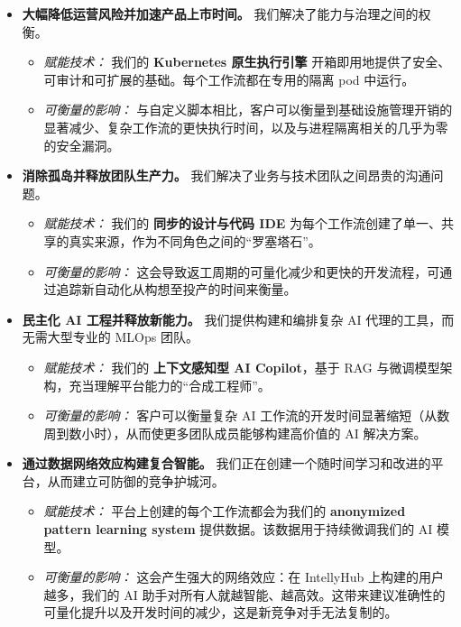 \documentclass[11pt, a4paper, oneside]{article}
\begin{document}
\begin{itemize}
    \item \textbf{大幅降低运营风险并加速产品上市时间。} 我们解决了能力与治理之间的权衡。
    \begin{itemize}
        \item \textit{赋能技术：} 我们的 \textbf{Kubernetes 原生执行引擎} 开箱即用地提供了安全、可审计和可扩展的基础。每个工作流都在专用的隔离 pod 中运行。
        \item \textit{可衡量的影响：} 与自定义脚本相比，客户可以衡量到基础设施管理开销的显著减少、复杂工作流的更快执行时间，以及与进程隔离相关的几乎为零的安全漏洞。
    \end{itemize}

    \item \textbf{消除孤岛并释放团队生产力。} 我们解决了业务与技术团队之间昂贵的沟通问题。
    \begin{itemize}
        \item \textit{赋能技术：} 我们的 \textbf{同步的设计与代码 IDE} 为每个工作流创建了单一、共享的真实来源，作为不同角色之间的“罗塞塔石”。
        \item \textit{可衡量的影响：} 这会导致返工周期的可量化减少和更快的开发流程，可通过追踪新自动化从构想至投产的时间来衡量。
    \end{itemize}

    \item \textbf{民主化 AI 工程并释放新能力。} 我们提供构建和编排复杂 AI 代理的工具，而无需大型专业的 MLOps 团队。
    \begin{itemize}
        \item \textit{赋能技术：} 我们的 \textbf{上下文感知型 AI Copilot}，基于 RAG 与微调模型架构，充当理解平台能力的“合成工程师”。
        \item \textit{可衡量的影响：} 客户可以衡量复杂 AI 工作流的开发时间显著缩短（从数周到数小时），从而使更多团队成员能够构建高价值的 AI 解决方案。
    \end{itemize}
    
    \item \textbf{通过数据网络效应构建复合智能。} 我们正在创建一个随时间学习和改进的平台，从而建立可防御的竞争护城河。
    \begin{itemize}
        \item \textit{赋能技术：} 平台上创建的每个工作流都会为我们的 \textbf{anon\-ymized pattern learning system} 提供数据。该数据用于持续微调我们的 AI 模型。
        \item \textit{可衡量的影响：} 这会产生强大的网络效应：在 IntellyHub 上构建的用户越多，我们的 AI 助手对所有人就越智能、越高效。这带来建议准确性的可量化提升以及开发时间的减少，这是新竞争对手无法复制的。
    \end{itemize}
\end{itemize}
\end{document}
